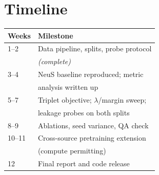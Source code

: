 \documentclass[10pt,twocolumn,a4paper]{article}
\begin{document}
\section{Timeline}

\begin{tabular}{@{}ll@{}}
\toprule
\textbf{Weeks} & \textbf{Milestone} \\
\midrule
1--2 & Data pipeline, splits, probe protocol \\
     & \emph{(complete)} \\
3--4 & NeuS baseline reproduced; metric \\
     & analysis written up \\
5--7 & Triplet objective; $\lambda$/margin sweep; \\
     & leakage probes on both splits \\
8--9 & Ablations, seed variance, QA check \\
10--11 & Cross-source pretraining extension \\
       & (compute permitting) \\
12 & Final report and code release \\
\bottomrule
\end{tabular}
\end{document}
